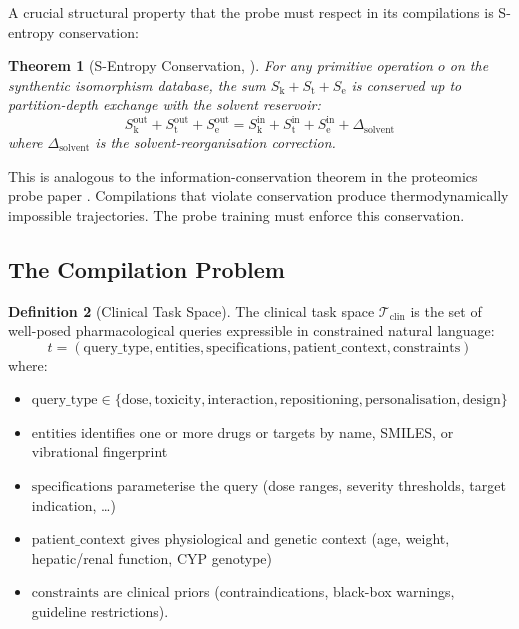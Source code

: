 \documentclass[11pt,twocolumn,a4paper]{article}
\newtheorem{theorem}{Theorem}[section]
\theoremstyle{definition}
\newtheorem{definition}[theorem]{Definition}
\theoremstyle{remark}
\newcommand{\Sk}{S_{\mathrm{k}}}
\newcommand{\St}{S_{\mathrm{t}}}
\newcommand{\Se}{S_{\mathrm{e}}}
\newcommand{\taskspace}{\mathcal{T}}
\begin{document}
A crucial structural property that the probe must respect in its compilations is S-entropy conservation:

\begin{theorem}[S-Entropy Conservation, \citep{sachikonye2025e}]
\label{thm:conservation}
For any primitive operation $o$ on the synthentic isomorphism database, the sum $\Sk + \St + \Se$ is conserved up to partition-depth exchange with the solvent reservoir:
\begin{equation}
\Sk^{\mathrm{out}} + \St^{\mathrm{out}} + \Se^{\mathrm{out}} = \Sk^{\mathrm{in}} + \St^{\mathrm{in}} + \Se^{\mathrm{in}} + \Delta_{\mathrm{solvent}}
\end{equation}
where $\Delta_{\mathrm{solvent}}$ is the solvent-reorganisation correction.
\end{theorem}

This is analogous to the information-conservation theorem in the proteomics probe paper \citep{sachikonye2025b}. Compilations that violate conservation produce thermodynamically impossible trajectories. The probe training must enforce this conservation.

\subsection{The Compilation Problem}
\label{sec:compilation_problem}

\begin{definition}[Clinical Task Space]
\label{def:clinical_task_space}
The clinical task space $\taskspace_{\mathrm{clin}}$ is the set of well-posed pharmacological queries expressible in constrained natural language:
\begin{equation}
t = (\text{query\_type}, \text{entities}, \text{specifications}, \text{patient\_context}, \text{constraints})
\end{equation}
where:
\begin{itemize}[nosep,leftmargin=*]
\item $\text{query\_type} \in \{\mathrm{dose}, \mathrm{toxicity}, \mathrm{interaction}, \mathrm{repositioning}, \mathrm{personalisation}, \mathrm{design}\}$
\item $\text{entities}$ identifies one or more drugs or targets by name, SMILES, or vibrational fingerprint
\item $\text{specifications}$ parameterise the query (dose ranges, severity thresholds, target indication, \ldots)
\item $\text{patient\_context}$ gives physiological and genetic context (age, weight, hepatic/renal function, CYP genotype)
\item $\text{constraints}$ are clinical priors (contraindications, black-box warnings, guideline restrictions).
\end{itemize}
\end{definition}
\end{document}
